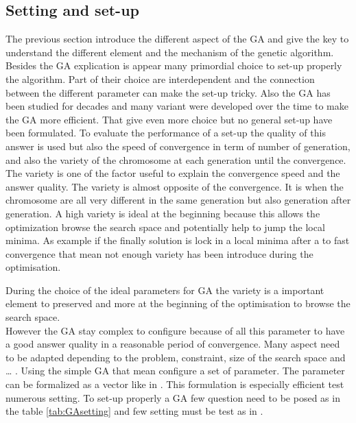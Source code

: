	
\subsection{Setting and  set-up} \label{sec:Setting and  set-up}

The previous section introduce the different aspect of the GA and give the key to understand the different element and the mechanism of the genetic algorithm. Besides the GA explication is appear many primordial  choice  to set-up properly the algorithm. Part of their choice are interdependent and the connection between the different parameter can make the set-up tricky.
Also the GA has been studied for decades and many variant were developed over the time to make the GA more efficient. That give even more choice but no general set-up have been formulated.
To evaluate the  performance of a set-up the quality of this answer is used but also the speed of convergence in term of number of generation, and also the variety of the chromosome at each generation until the convergence. 
The variety is one of the factor useful to explain the convergence speed and the answer quality.
The variety is almost opposite of the convergence. It is when the chromosome  are all very different in the same generation but also generation after generation. A high variety is ideal at the beginning because this allows the optimization browse the search space and potentially help to jump the local minima. 
 As example if the finally solution is lock in a local minima after a to fast convergence that mean not enough variety has been introduce during the optimisation.

During the choice of the ideal parameters for GA the variety is a important element to preserved and more at the beginning of the optimisation to browse the search space.\\
 
However the GA stay complex to configure because of all this parameter to have a good answer quality in a reasonable period of convergence. Many aspect need to be adapted depending to the problem, constraint, size of the search space and … .   
Using the simple GA that mean configure a set of parameter. The parameter can be formalized as a vector like in \cite{71*grefenstette1986}. This formulation is especially  efficient test numerous setting. 
To set-up properly a GA few question need to be posed as in the table \ref{tab:GAsetting} and few setting must be test as in \cite{73*wright1991,71*grefenstette1986,133*schwefel1984}.

